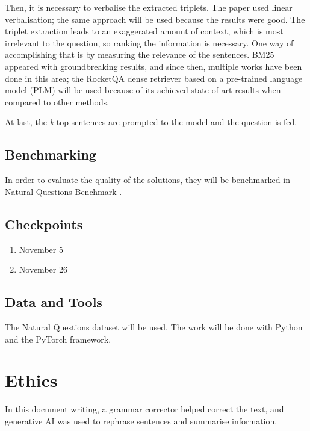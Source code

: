 \documentclass{article}
\begin{document}
Then, it is necessary to verbalise the extracted triplets. The paper used linear verbalisation; the same approach will be used because the results were good. The triplet extraction leads to an exaggerated amount of context, which is most irrelevant to the question, so ranking the information is necessary. One way of accomplishing that is by measuring the relevance of the sentences. BM25 \cite{INR-019} appeared with groundbreaking results, and since then, multiple works have been done in this area; the RocketQA \cite{ren-etal-2021-rocketqav2} dense retriever based on a pre-trained language model (PLM) will be used because of its achieved state-of-art results when compared to other methods.

At last, the \textit{k} top sentences are prompted to the model and the question is fed.


\subsection{Benchmarking}

In order to evaluate the quality of the solutions, they will be benchmarked in Natural Questions Benchmark \cite{47761}.


\subsection{Checkpoints}

\begin{enumerate}
	\item November 5
	\item November 26
\end{enumerate}

\subsection{Data and Tools}

The Natural Questions dataset will be used. The work will be done with Python and the PyTorch framework.

\section{Ethics}

In this document writing, a grammar corrector helped correct the text, and generative AI was used to rephrase sentences and summarise information.


\printbibliography
\end{document}
